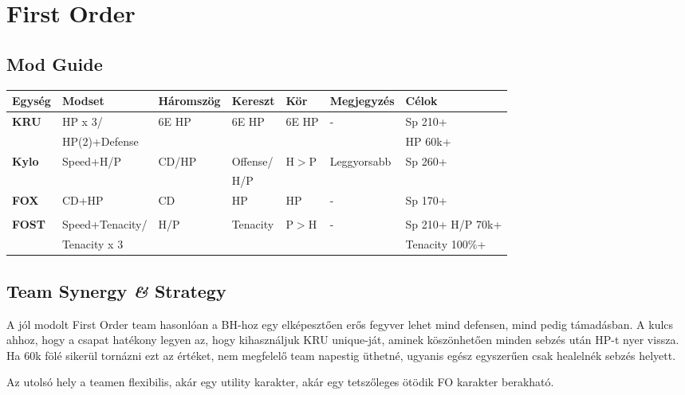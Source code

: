 \documentclass[11pt]{report}
\begin{document}

\chapter{First Order}
\section{Mod Guide}
\begin{center}
    \begin{tabular}{|l | l | l | l | l | l | l |}
        \hline
        Egység & Modset & Háromszög & Kereszt & Kör & Megjegyzés & Célok\\ \hline
        \textbf{KRU} & HP x 3/ & 6E HP & 6E HP & 6E HP & - & Sp 210+\\
        & HP(2)+Defense &  &  &  &  & HP 60k+\\ \hline
        \textbf{Kylo} & Speed+H/P & CD/HP & Offense/ & H$>$P & Leggyorsabb & Sp 260+\\
        &  &  & H/P &  &  & \\ \hline
        \textbf{FOX} & CD+HP & CD & HP & HP & - & Sp 170+\\
        &  &  &  &  &  & \\ \hline
        \textbf{FOST} & Speed+Tenacity/ & H/P & Tenacity & P$>$H & - & Sp 210+ H/P 70k+\\
        & Tenacity x 3 &  &  &  &  & Tenacity 100\%+\\ \hline
    \end{tabular}
\end{center}
\section{Team Synergy \textit{\&} Strategy}
A jól modolt First Order team hasonlóan a BH-hoz egy elképesztően erős fegyver lehet mind defensen, mind pedig támadásban. A kulcs ahhoz, hogy a csapat hatékony legyen az, hogy kihasználjuk KRU unique-ját, aminek köszönhetően minden sebzés után HP-t nyer vissza. Ha 60k fölé sikerül tornázni ezt az értéket, nem megfelelő team napestig üthetné, ugyanis egész egyszerűen csak healelnék sebzés helyett.\par
Az utolsó hely a teamen flexibilis, akár egy utility karakter, akár egy tetszőleges ötödik FO karakter berakható.

\end{document}
